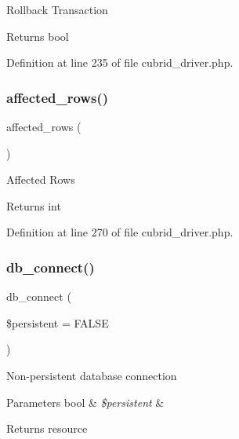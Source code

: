 Rollback Transaction

\begin{DoxyReturn}{Returns}
bool 
\end{DoxyReturn}


Definition at line 235 of file cubrid\+\_\+driver.\+php.

\mbox{\label{class_c_i___d_b__cubrid__driver_a77248aaad33eb132c04cc4aa3f4bc8cb}} 
\subsubsection{\texorpdfstring{affected\_rows()}{affected\_rows()}}
{\footnotesize\ttfamily affected\+\_\+rows (\begin{DoxyParamCaption}{ }\end{DoxyParamCaption})}

Affected Rows

\begin{DoxyReturn}{Returns}
int 
\end{DoxyReturn}


Definition at line 270 of file cubrid\+\_\+driver.\+php.

\mbox{\label{class_c_i___d_b__cubrid__driver_a52bf595e79e96cc0a7c907a9b45aeb4d}} 
\subsubsection{\texorpdfstring{db\_connect()}{db\_connect()}}
{\footnotesize\ttfamily db\+\_\+connect (\begin{DoxyParamCaption}\item[{}]{\$persistent = {\ttfamily FALSE} }\end{DoxyParamCaption})}

Non-\/persistent database connection


\begin{DoxyParams}[1]{Parameters}
bool & {\em \$persistent} & \\
\hline
\end{DoxyParams}
\begin{DoxyReturn}{Returns}
resource 
\end{DoxyReturn}



